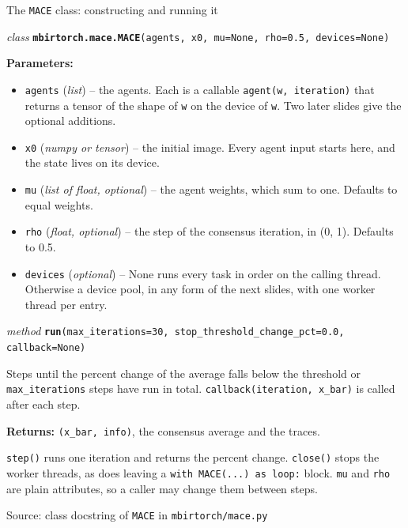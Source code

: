 \documentclass[aspectratio=169,10pt]{beamer}
\newcommand{\tagchip}[2]{{\setlength{\fboxsep}{2.5pt}\setlength{\fboxrule}{0.6pt}%
  \fcolorbox{white}{#1}{\textcolor{white}{\footnotesize\bfseries\strut #2}}}}
\newcommand{\macechip}{\tagchip{planAccent}{MACE}}
\newcommand{\source}[1]{\par\vfill{\scriptsize\textcolor{inkGray}{Source: #1}\par}}
\newcommand{\sig}[3]{\begin{sigbox}\raggedright\scriptsize\hangindent=14pt\hangafter=1
  \textit{#1} \texttt{\textbf{#2}(#3)}\end{sigbox}}
\newenvironment{params}{\par{\scriptsize\textbf{Parameters:}}\par\vspace{-6pt}%
  \begin{itemize}\scriptsize\setlength{\itemsep}{0pt}\setlength{\topsep}{0pt}}{\end{itemize}\vspace{-2pt}}
\newcommand{\param}[3]{\item \texttt{#1} (\textit{#2}) -- #3}
\newcommand{\returns}[1]{\par{\scriptsize\textbf{Returns:} #1\par}}
\newcommand{\sigtext}[1]{{\scriptsize #1\par}}
\begin{document}
\begin{frame}{The \texttt{MACE} class: constructing and running it \hfill \macechip}
  \vspace{2pt}
  \sig{class}{mbirtorch.mace.MACE}{agents, x0, mu=None, rho=0.5, devices=None}
  \begin{params}
    \param{agents}{list}{the agents.  Each is a callable \texttt{agent(w, iteration)} that returns a tensor of the shape of \texttt{w} on the device of \texttt{w}.  Two later slides give the optional additions.}
    \param{x0}{numpy or tensor}{the initial image.  Every agent input starts here, and the state lives on its device.}
    \param{mu}{list of float, optional}{the agent weights, which sum to one.  Defaults to equal weights.}
    \param{rho}{float, optional}{the step of the consensus iteration, in (0, 1).  Defaults to 0.5.}
    \param{devices}{optional}{None runs every task in order on the calling thread.  Otherwise a device pool, in any form of the next slides, with one worker thread per entry.}
  \end{params}
  \vspace{3pt}
  \sig{method}{run}{max\_iterations=30, stop\_threshold\_change\_pct=0.0, callback=None}
  \sigtext{Steps until the percent change of the average falls below the
  threshold or \texttt{max\_iterations} steps have run in total.
  \texttt{callback(iteration, x\_bar)} is called after each step.}
  \returns{\texttt{(x\_bar, info)}, the consensus average and the traces.}
  \vspace{3pt}
  \sigtext{\texttt{step()} runs one iteration and returns the percent
  change.  \texttt{close()} stops the worker threads, as does leaving a
  \texttt{with MACE(...) as loop:} block.  \texttt{mu} and \texttt{rho} are
  plain attributes, so a caller may change them between steps.}
  \source{class docstring of \texttt{MACE} in \texttt{mbirtorch/mace.py}}
\end{frame}
\end{document}
